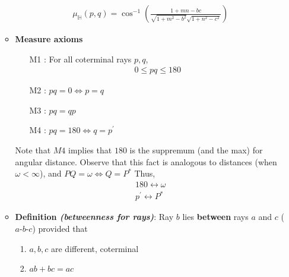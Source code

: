 \documentclass{report}
\begin{document}
\begin{itemize}
\begin{itemize}
                    \bigbreak \noindent 
                    \bigbreak \noindent 
                    \begin{figure}[ht]
                        \centering
                        \label{fig:diag2}
                    \end{figure}
                    \bigbreak \noindent 
                    \begin{align*}
                       \mu_{\mathbb{H}}(p,q) = \cos^{-1}{\left(\frac{1+mn-bc}{\sqrt{1+m^{2}-b^{2}}\sqrt{1+n^{2}-c^{2}}}\right)} 
                    \end{align*}
                \item \textbf{Measure axioms}
                    \begin{enumerate}
                        \item [M1]: For all coterminal rays $p,q$,
                            \begin{align*}
                                0 \leq pq \leq 180
                            \end{align*}
                        \item [M2]: $pq = 0 \iff p=q$
                        \item [M3]: $pq = qp$
                        \item [M4]: $pq = 180 \iff q=p^{\prime} $
                    \end{enumerate}
                    \bigbreak \noindent 
                    Note that $M4$ implies that $180$ is the suppremum (and the max) for angular distance. Observe that this fact is analogous to distances (when $\omega < \infty$), and $PQ = \omega \iff Q = P^{*} $
                    \bigbreak \noindent 
                    Thus,
                    \begin{align*}
                        180 \leftrightarrow \omega \\
                        p^{\prime} \leftrightarrow P^{*}
                    \end{align*}
                \item \textbf{Definition \textit{(betweenness for rays)}}: Ray $b$ lies \textbf{between} rays $a$ and $c$ ($ a\text{-}b\text{-}c $) provided that
                    \begin{enumerate}[label=(\alph*)]
                        \item $a,b,c$ are different, coterminal
                        \item $ab + bc = ac $

\end{enumerate}
\end{itemize}
\end{itemize}
\end{document}
